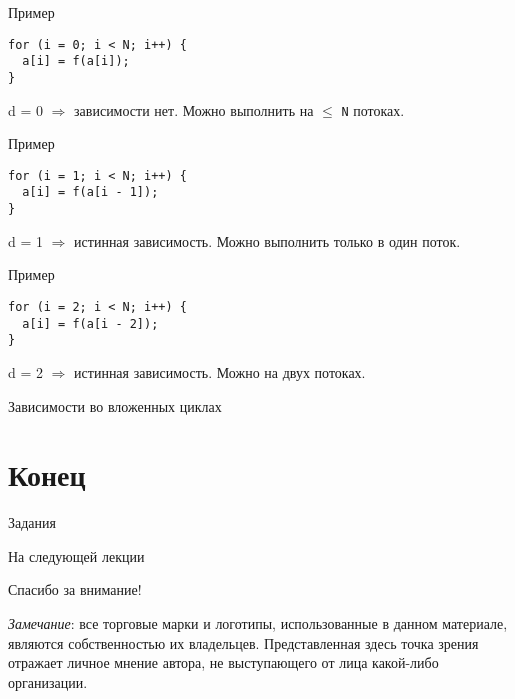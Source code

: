 \begin{frame}[fragile]{Пример}

\begin{lstlisting}
for (i = 0; i < N; i++) {
  a[i] = f(a[i]);
}
\end{lstlisting}

\pause\bigskip

d = 0 $\Rightarrow$ зависимости нет. Можно выполнить на $\leq$ \texttt{N} потоках.
\end{frame}

\begin{frame}[fragile]{Пример}
\begin{lstlisting}
for (i = 1; i < N; i++) {
  a[i] = f(a[i - 1]);
}
\end{lstlisting}

\pause\bigskip

d = 1 $\Rightarrow$ истинная зависимость. Можно выполнить только в один поток.
\end{frame}

\begin{frame}[fragile]{Пример}
\begin{lstlisting}
for (i = 2; i < N; i++) {
  a[i] = f(a[i - 2]);
}
\end{lstlisting}

\pause\bigskip

d = 2 $\Rightarrow$ истинная зависимость. Можно на двух потоках.
\end{frame}

\begin{frame}{Зависимости во вложенных циклах}
\end{frame}

\section*{Конец}

\begin{frame}{Задания}
\end{frame}

\begin{frame}{На следующей лекции}
\end{frame}

\begin{frame}

{\huge{Спасибо за внимание!}\par}

\vfill

\tiny{\textit{Замечание}: все торговые марки и логотипы, использованные в данном материале, являются собственностью их владельцев. Представленная здесь точка зрения отражает личное мнение автора, не выступающего от лица какой-либо организации.}

\end{frame}



